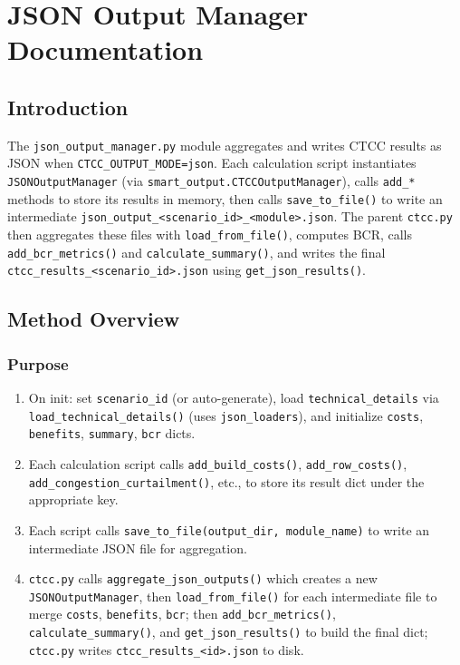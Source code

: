 \documentclass[ctcc_full_documentation.tex]{subfiles}
\begin{document}
\chapter{JSON Output Manager Documentation}

\section{Introduction}

The \texttt{json\_output\_manager.py} module aggregates and writes CTCC results as JSON when \texttt{CTCC\_OUTPUT\_MODE=json}. Each calculation script instantiates \texttt{JSONOutputManager} (via \texttt{smart\_output.CTCCOutputManager}), calls \texttt{add\_*} methods to store its results in memory, then calls \texttt{save\_to\_file()} to write an intermediate \texttt{json\_output\_<scenario\_id>\_<module>.json}. The parent \texttt{ctcc.py} then aggregates these files with \texttt{load\_from\_file()}, computes BCR, calls \texttt{add\_bcr\_metrics()} and \texttt{calculate\_summary()}, and writes the final \texttt{ctcc\_results\_<scenario\_id>.json} using \texttt{get\_json\_results()}.

\section{Method Overview}

\subsection{Purpose}

\begin{enumerate}
    \item On init: set \texttt{scenario\_id} (or auto-generate), load \texttt{technical\_details} via \texttt{load\_technical\_details()} (uses \texttt{json\_loaders}), and initialize \texttt{costs}, \texttt{benefits}, \texttt{summary}, \texttt{bcr} dicts.
    \item Each calculation script calls \texttt{add\_build\_costs()}, \texttt{add\_row\_costs()}, \texttt{add\_congestion\_curtailment()}, etc., to store its result dict under the appropriate key.
    \item Each script calls \texttt{save\_to\_file(output\_dir, module\_name)} to write an intermediate JSON file for aggregation.
    \item \texttt{ctcc.py} calls \texttt{aggregate\_json\_outputs()} which creates a new \texttt{JSONOutputManager}, then \texttt{load\_from\_file()} for each intermediate file to merge \texttt{costs}, \texttt{benefits}, \texttt{bcr}; then \texttt{add\_bcr\_metrics()}, \texttt{calculate\_summary()}, and \texttt{get\_json\_results()} to build the final dict; \texttt{ctcc.py} writes \texttt{ctcc\_results\_<id>.json} to disk.
\end{enumerate}
\end{document}
